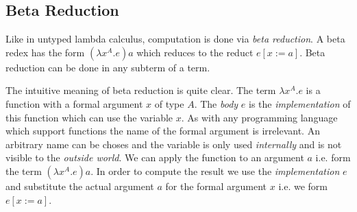 \subsection{Beta Reduction}

Like in untyped lambda calculus, computation is done via \emph{beta reduction}.
A beta redex has the form $(\lambda x^A. e) a$ which reduces to the reduct
$e[x:=a]$. Beta reduction can be done in any subterm of a term.

The intuitive meaning of beta reduction is quite clear. The term $\lambda x^A.e$
is a function with a formal argument $x$ of type $A$. The \emph{body} $e$ is the
\emph{implementation} of this function which can use the variable $x$. As with
any programming language which support functions the name of the formal
argument is irrelevant. An arbitrary name can be choses and the variable is only
used \emph{internally} and is not visible to the \emph{outside world}. We can
apply the function to an argument $a$ i.e. form the term $(\lambda x^A.e) a$. In
order to compute the result we use the \emph{implementation} $e$ and substitute
the actual argument $a$ for the formal argument $x$ i.e. we form $e[x:=a]$.


